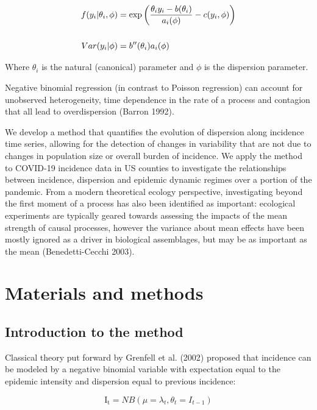 \documentclass[10pt,letterpaper]{article}
\begin{document}
\begin{align}
  f(y_i| \theta_i, \phi) &= \exp\left( \dfrac{\theta_i y_i - b (\theta_i)}{a_i(\phi)} - c(y_i, \phi) \right) \\
  \notag \\
  Var(y_i | \phi) &= b''(\theta_i) a_i(\phi)
\end{align}


Where $\theta_i$ is the natural (canonical) parameter and $\phi$ is the dispersion parameter.

Negative binomial regression (in contrast to Poisson regression) can account for unobserved heterogeneity, time dependence in the rate of a process and contagion that all lead to overdispersion (Barron 1992).

We develop a method that quantifies the evolution of dispersion along incidence time series, allowing for the detection of changes in variability that are not due to changes in population size or overall burden of incidence. We apply the method to COVID-19 incidence data in US counties to investigate the relationships between incidence, dispersion and epidemic dynamic regimes over a portion of the pandemic. From a modern theoretical ecology perspective, investigating beyond the first moment of a process has also been identified as important: ecological experiments are typically geared towards assessing the impacts of the mean strength of causal processes, however the variance about mean effects have been mostly ignored as a driver in biological assemblages, but may be as important as the mean (Benedetti-Cecchi 2003).

\section*{Materials and methods}
\subsection*{Introduction to the method}

Classical theory put forward by Grenfell et al. (2002) proposed that incidence can be modeled by a negative binomial variable with expectation equal to the epidemic intensity and dispersion equal to previous incidence:

\begin{equation}
    \mathrm{I_t} = NB(\mu = \lambda_t, \theta_t = I_{t-1})
\end{equation}
\end{document}
